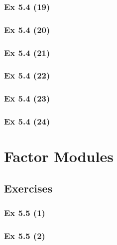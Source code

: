 \subsubsection{Ex 5.4 (19)}\label{sec:Ex_5.4.19}

\subsubsection{Ex 5.4 (20)}\label{sec:Ex_5.4.20}

\newpage		%

\subsubsection{Ex 5.4 (21)}\label{sec:Ex_5.4.21}

\subsubsection{Ex 5.4 (22)}\label{sec:Ex_5.4.22}

\subsubsection{Ex 5.4 (23)}\label{sec:Ex_5.4.23}

\subsubsection{Ex 5.4 (24)}\label{sec:Ex_5.4.24}


\newpage		%

\section{Factor Modules}\label{sec:5.5}
\subsection{Exercises}\label{sec:5.5_Exercises}

\subsubsection{Ex 5.5 (1)}\label{sec:Ex_5.5.1}

\subsubsection{Ex 5.5 (2)}\label{sec:Ex_5.5.2}

